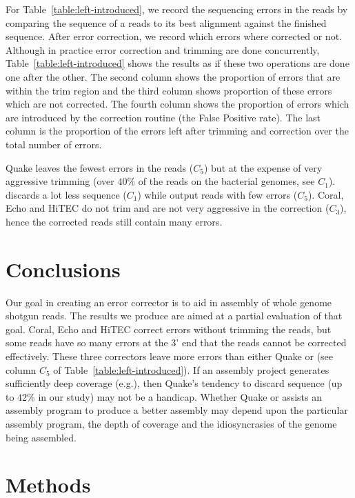 \documentclass[10pt]{bmc_article}
\newenvironment{bmcformat}{\fussy\setboolean{publ}{true}}{\fussy}
\begin{document}
\begin{bmcformat}
For Table~\ref{table:left-introduced}, we record the sequencing errors in the reads by comparing the sequence of a reads to its best alignment against the finished sequence.
After error correction, we record which errors where corrected or not.
Although in practice error correction and trimming are done concurrently, Table~\ref{table:left-introduced} shows the results as if these two operations are done one after the other.
The second column shows the proportion of errors that are within the trim region and the third column shows proportion of these errors which are not corrected.
The fourth column shows the proportion of errors which are introduced by the correction routine (the False Positive rate).
The last column is the proportion of the errors left after trimming and correction over the total number of errors.

Quake leaves the fewest errors in the reads ($C_5$) but at the expense of very aggressive trimming (over $40\%$ of the reads on the bacterial genomes, see $C_1$).
\quorum discards a lot less sequence ($C_1$) while output reads with few errors ($C_5$).
Coral, Echo and HiTEC do not trim and are not very aggressive in the correction ($C_3$), hence the corrected reads still contain many errors.

\section*{Conclusions}
Our goal in creating an error corrector is to aid in assembly of whole genome shotgun reads.
The results we produce are aimed at a partial evaluation of that goal.
Coral, Echo and HiTEC correct errors without trimming the reads, but some reads have so many errors at the 3' end that the reads cannot be corrected effectively.
These three correctors leave more errors than either Quake or \quorum (see column $C_5$ of Table~\ref{table:left-introduced}).
If an assembly project generates sufficiently deep coverage (e.g.\@ {}), then Quake's tendency to discard sequence (up to $42\%$ in our study) may not be a handicap.
Whether Quake or \quorum assists an assembly program to produce a better assembly may depend upon the particular assembly program, the depth of coverage and the idiosyncrasies of the genome being assembled.

  
\section*{Methods}
\label{sec:Methods}


\end{bmcformat}
\end{document}
